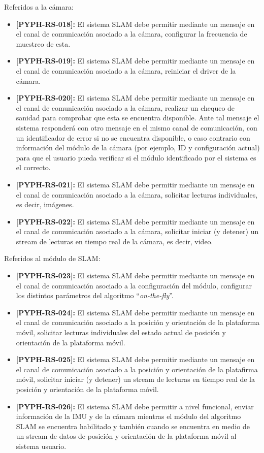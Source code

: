\documentclass[12pt,a4paper, twosite]{article}
\begin{document}
Referidos a la cámara:

\begin{itemize}
  \item \textbf{[PYPH-RS-018]:} El sistema SLAM debe permitir mediante un mensaje en el canal de
  comunicación asociado a la cámara, configurar la frecuencia de muestreo de esta.
  \item \textbf{[PYPH-RS-019]:} El sistema SLAM debe permitir mediante un mensaje en el canal de
  comunicación asociado a la cámara, reiniciar el driver de la cámara.
  \item \textbf{[PYPH-RS-020]:} El sistema SLAM debe permitir mediante un mensaje en el canal de
  comunicación asociado a la cámara, realizar un chequeo de sanidad para comprobar que esta se
  encuentra disponible. Ante tal mensaje el sistema responderá con otro mensaje en el mismo
  canal de comunicación, con un identificador de error si no se encuentra disponible, o caso
  contrario con información del módulo de la cámara (por ejemplo, ID y configuración actual) 
  para que el usuario pueda verificar si el módulo identificado por el sistema es el correcto.
  \item \textbf{[PYPH-RS-021]:} El sistema SLAM debe permitir mediante un mensaje en el canal de
  comunicación asociado a la cámara, solicitar lecturas individuales, es decir, imágenes.
  \item \textbf{[PYPH-RS-022]:} El sistema SLAM debe permitir mediante un mensaje en el canal de
  comunicación asociado a la cámara, solicitar iniciar (y detener) un stream de lecturas en
  tiempo real de la cámara, es decir, video.
\end{itemize}

Referidos al módulo de SLAM:

\begin{itemize}
  \item \textbf{[PYPH-RS-023]:} El sistema SLAM debe permitir mediante un mensaje en el canal de
  comunicación asociado a la configuración del módulo, configurar los distintos parámetros del
  algoritmo ``\textit{on-the-fly}''.
  \item \textbf{[PYPH-RS-024]:} El sistema SLAM debe permitir mediante un mensaje en el canal de
  comunicación asociado a la posición y orientación de la plataforma móvil, solicitar lecturas individuales del estado actual de posición y orientación de la plataforma móvil.
  \item \textbf{[PYPH-RS-025]:} El sistema SLAM debe permitir mediante un mensaje en el canal de
  comunicación asociado a la posición y orientación de la platafirma móvil, solicitar iniciar
  (y detener) un stream de lecturas en tiempo real de la posición y orientación de la plataforma
  móvil.
  \item \textbf{[PYPH-RS-026]:} El sistema SLAM debe permitir a nivel funcional, enviar
  información de la IMU y de la cámara mientras el módulo del algoritmo SLAM se encuentra
  habilitado y también cuando se encuentra en medio de un stream de datos de posición y
  orientación de la plataforma móvil al sistema usuario.
\end{itemize}
\end{document}
